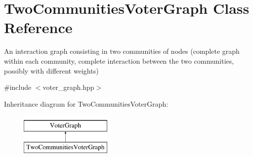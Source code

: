 \hypertarget{class_two_communities_voter_graph}{}\section{Two\+Communities\+Voter\+Graph Class Reference}
\label{class_two_communities_voter_graph}


An interaction graph consisting in two communities of nodes (complete graph within each community, complete interaction between the two communities, possibly with different weights)  




{\ttfamily \#include $<$voter\+\_\+graph.\+hpp$>$}

Inheritance diagram for Two\+Communities\+Voter\+Graph\+:\begin{figure}[H]
\begin{center}
\leavevmode
\includegraphics[height=2.000000cm]{class_two_communities_voter_graph}
\end{center}
\end{figure}
